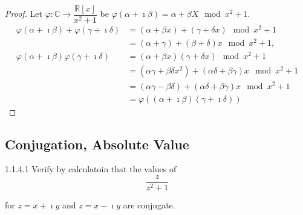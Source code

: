 \begin{proof}
	Let \( \varphi: \mathbb{C} \to \dfrac{\mathbb{R}[x]}{x^{2} + 1} \) be \( \varphi(\alpha + \imath\beta) = \alpha + \beta X \mod{x^{2} + 1} \).
	\begingroup
	\allowdisplaybreaks%
	\begin{align*}
		\varphi(\alpha + \imath\beta) + \varphi(\gamma + \imath\delta) & = (\alpha + \beta x) + (\gamma + \delta x) \mod{x^{2} + 1}                           \\
		                                                               & = (\alpha + \gamma) + (\beta + \delta)x \mod{x^{2} + 1},                             \\
		\varphi(\alpha + \imath\beta)\varphi(\gamma + \imath\delta)    & = (\alpha + \beta x)(\gamma + \delta x) \mod{x^{2} + 1}                              \\
		                                                               & = (\alpha\gamma + \beta\delta x^{2}) + (\alpha\delta + \beta\gamma)x \mod{x^{2} + 1} \\
		                                                               & = (\alpha\gamma - \beta\delta) + (\alpha\delta + \beta\gamma)x \mod{x^{2} + 1}       \\
		                                                               & = \varphi((\alpha + \imath\beta)(\gamma + \imath\delta))
	\end{align*}
	\endgroup
\end{proof}

\subsection{Conjugation, Absolute Value}

\begin{problem}{1.1.4.1}
Verify by calculatoin that the values of
\[
	\dfrac{z}{z^{2} + 1}
\]

for \( z = x + \imath y \) and \( z = x - \imath y \) are conjugate.
\end{problem}

